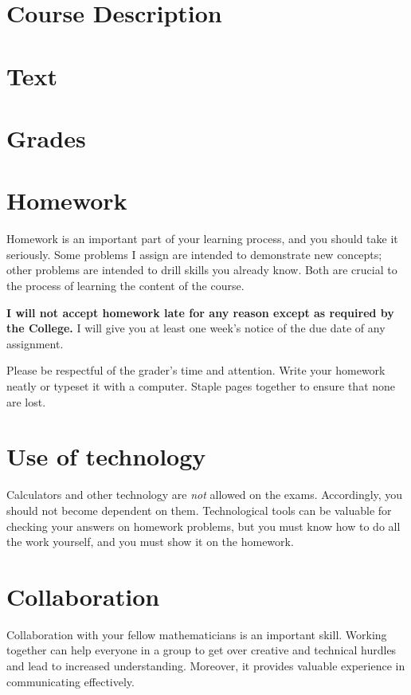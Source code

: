 \documentclass[11pt,article]{memoir}
\begin{document}
\maketitle

\section*{Course Description}

\section*{Text}

\section*{Grades}

\section*{Homework}
Homework is an important part of your learning process, and you should take it seriously.
Some problems I assign are intended to demonstrate new concepts; other problems are intended to drill skills you already know.
Both are crucial to the process of learning the content of the course.

\textbf{I will not accept homework late for any reason except as required by the College.}
I will give you at least one week's notice of the due date of any assignment.

Please be respectful of the grader's time and attention.
Write your homework neatly or typeset it with a computer.
Staple pages together to ensure that none are lost.

\section*{Use of technology}
Calculators and other technology are \emph{not} allowed on the exams.
Accordingly, you should not become dependent on them.
Technological tools can be valuable for checking your answers on homework problems, but you must know how to do all the work yourself, and you must show it on the homework.

\section*{Collaboration}
Collaboration with your fellow mathematicians is an important skill.
Working together can help everyone in a group to get over creative and technical hurdles and lead to increased understanding.
Moreover, it provides valuable experience in communicating effectively.
\end{document}
